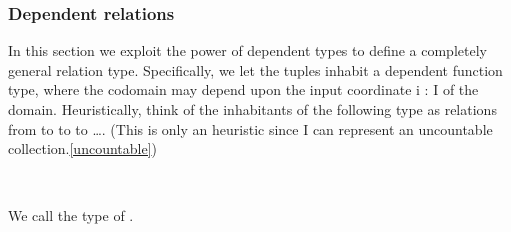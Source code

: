 \subsubsection{Dependent relations}\label{dependent-relations}

In this section we exploit the power of dependent types to define a completely general relation type. Specifically, we let the tuples inhabit a dependent function type, where the codomain may depend upon the input coordinate \ab i \as : \ab I of the domain. 
Heuristically, think of the inhabitants of the following type as relations from   to   to   to …. (This is only an heuristic since \ab I can represent an uncountable collection.\cref{uncountable})
\ccpad
\begin{code}%
\>[0]\AgdaSpace{}%
\AgdaSymbol{:}\AgdaSpace{}%
\AgdaSymbol{(}\AgdaSpace{}%
\AgdaSymbol{:}\AgdaSpace{}%
\AgdaSpace{}%
\AgdaSymbol{)}\AgdaSpace{}%
\AgdaSpace{}%
\AgdaSymbol{(}\AgdaSpace{}%
\AgdaSpace{}%
\AgdaSpace{}%
\AgdaSymbol{)}\AgdaSpace{}%
\AgdaSpace{}%
\AgdaSymbol{(}\AgdaSpace{}%
\AgdaSymbol{:}\AgdaSpace{}%
\AgdaSymbol{)}\AgdaSpace{}%
\AgdaSpace{}%
\AgdaSpace{}%
\AgdaSpace{}%
\AgdaSpace{}%
\AgdaSpace{}%
\AgdaSpace{}%
\AgdaSpace{}%
\<%
\\
\>[0]\AgdaSpace{}%
\AgdaSpace{}%
\AgdaSpace{}%
\AgdaSpace{}%
\AgdaSymbol{=}\AgdaSpace{}%
\AgdaSpace{}%
\AgdaSpace{}%
\AgdaSpace{}%
\AgdaSpace{}%
\<%
\end{code}
\ccpad
We call  the type of .


